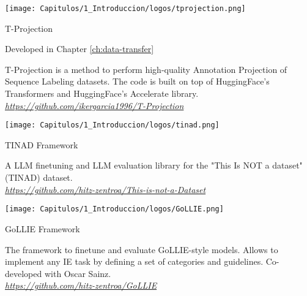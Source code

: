 \begin{resources}
    {
    \begin{adjustbox}{valign=c}
    \texttt{[image: Capitulos/1\_Introduccion/logos/tprojection.png]}
    \end{adjustbox}
    \begin{adjustbox}{valign=c}
    \begin{minipage}{\textwidth}
    T-Projection
    \end{minipage}
    \end{adjustbox}
    }
    \begin{resourcessmall}
    Developed in Chapter \ref{ch:data-transfer}
    \end{resourcessmall}
    T-Projection is a method to perform high-quality Annotation Projection of Sequence Labeling datasets. The code is built on top of HuggingFace's Transformers and HuggingFace's Accelerate library. \\
    \textit{\href{https://github.com/ikergarcia1996/T-Projection}{https://github.com/ikergarcia1996/T-Projection}}
\end{resources}

\begin{resources}
    {
    \begin{adjustbox}{valign=c}
    \texttt{[image: Capitulos/1\_Introduccion/logos/tinad.png]}
    \end{adjustbox}
    \begin{adjustbox}{valign=c}
    \begin{minipage}{\textwidth}
    TINAD Framework
    \end{minipage}
    \end{adjustbox}
    }
    A LLM finetuning and LLM evaluation library for the "This Is NOT a dataset" (TINAD) dataset.  \\
    \textit{\href{https://github.com/hitz-zentroa/This-is-not-a-Dataset}{https://github.com/hitz-zentroa/This-is-not-a-Dataset}}
\end{resources}


\begin{resources}
    {
    \begin{adjustbox}{valign=c}
    \texttt{[image: Capitulos/1\_Introduccion/logos/GoLLIE.png]}
    \end{adjustbox}
    \begin{adjustbox}{valign=c}
    \begin{minipage}{\textwidth}
    GoLLIE Framework
    \end{minipage}
    \end{adjustbox}
    }
    The framework to finetune and evaluate GoLLIE-style models. Allows to implement any IE task by defining a set of categories and guidelines. Co-developed with Oscar Sainz. \\
    \textit{\href{https://github.com/hitz-zentroa/GoLLIE}{https://github.com/hitz-zentroa/GoLLIE}}
\end{resources}

